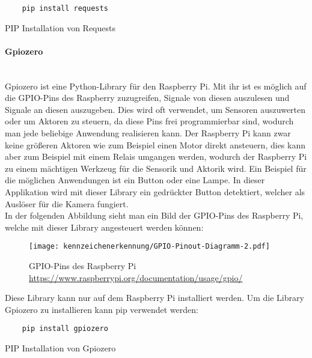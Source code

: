 \begin{listing}[H]
    \begin{verbatim}
    pip install requests
    \end{verbatim}
    \caption{PIP Installation von Requests}
\end{listing}

\paragraph{Gpiozero}\mbox{}\\
Gpiozero ist eine Python-Library für den Raspberry Pi. Mit ihr ist es möglich auf die GPIO-Pins des Raspberry zuzugreifen, Signale von diesen 
auszulesen und Signale an diesen auszugeben. Dies wird oft verwendet, um Sensoren auszuwerten oder um Aktoren zu steuern, da diese Pins frei 
programmierbar sind, wodurch man jede beliebige Anwendung realisieren kann. Der Raspberry Pi kann zwar keine größeren Aktoren wie zum Beispiel einen Motor direkt ansteuern, 
dies kann aber zum Beispiel mit einem Relais umgangen werden, wodurch der Raspberry Pi zu einem mächtigen Werkzeug für die Sensorik und Aktorik wird. 
Ein Beispiel für die möglichen Anwendungen ist ein Button oder eine Lampe. In dieser Applikation wird mit dieser Library ein gedrückter Button detektiert, 
welcher als Auslöser für die Kamera fungiert.\\

In der folgenden Abbildung sieht man ein Bild der GPIO-Pins des Raspberry Pi, welche mit dieser Library angesteuert werden können:

\begin{figure}[H]
    \centering
    \texttt{[image: kennzeichenerkennung/GPIO-Pinout-Diagramm-2.pdf]}
    \caption{GPIO-Pins des Raspberry Pi \url{https://www.raspberrypi.org/documentation/usage/gpio/}}
\end{figure}

Diese Library kann nur auf dem Raspberry Pi installiert werden. Um die Library Gpiozero zu installieren kann pip verwendet werden:

\begin{listing}[H]
    \begin{verbatim}
    pip install gpiozero
    \end{verbatim}
    \caption{PIP Installation von Gpiozero}
\end{listing}

